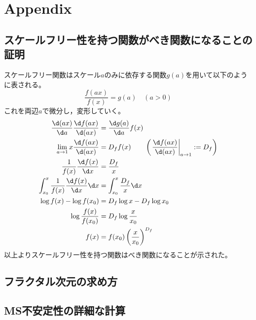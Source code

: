 \documentclass[autodetect-engine,dvi=dvipdfmx,a4paper,ja=standard,oneside,openany,11pt,draft,textwidth=50zw]{bxjsbook}
\begin{document}
\appendix
\chapter{Appendix}
\section{スケールフリー性を持つ関数がべき関数になることの証明}
\label{sec:scale_free}
スケールフリー関数はスケール$a$のみに依存する関数$g(a)$を用いて以下のように表される。
\begin{equation}
  \frac{f(ax)}{f(x)}=g(a) \quad (a>0)
\end{equation}
これを両辺$a$で微分し，変形していく。
\begin{equation}
  \begin{split}
    \frac{\d (ax)}{\d a}\frac{\d f(ax)}{\d (ax)}          & =\frac{\d g(a)}{\d a}f(x)                                                       \\
    \lim_{a\to 1}x\frac{\d f(ax)}{\d (ax)}                & =D_f f(x) \qquad\left(\left.\frac{\d f(ax)}{\d (ax)}\right|_{a\to1}:=D_f\right) \\
    \frac{1}{f(x)}\frac{\d f(x)}{\d x}                    & =\frac{D_f}{x}                                                                  \\
    \int_{x_0}^{x} \frac{1}{f(x)}\frac{\d f(x)}{\d x}\d x & =\int_{x_0}^{x} \frac{D_f}{x}\d x                                               \\
    \log f(x)-\log f(x_0)                                 & =D_f\log x-D_f\log x_0                                                          \\
    \log \frac{f(x)}{f(x_0)}                              & =D_f\log \frac{x}{x_0}                                                          \\
    f(x)                                                  & =f(x_0)\left(\frac{x}{x_0}\right)^{D_f}
  \end{split}
\end{equation}
以上よりスケールフリー性を持つ関数はべき関数になることが示された。
\section{フラクタル次元の求め方}
\section{MS不安定性の詳細な計算}
\end{document}
